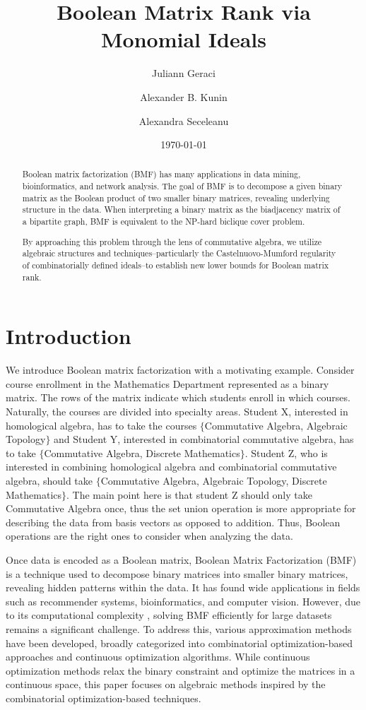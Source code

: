 \documentclass[11pt,letterpaper, reqno]{amsart}
\title{Boolean Matrix Rank via Monomial Ideals}
\author[]{Juliann Geraci}
\author[]{Alexander B. Kunin}
\author[]{Alexandra Seceleanu}
\date{\today}
\theoremstyle{definition}
\theoremstyle{remark}
\numberwithin{equation}{section}
\begin{document}
\begin{abstract}
Boolean matrix factorization (BMF) has many applications in data mining, bioinformatics, and network analysis. The goal of BMF is to decompose a given binary matrix as the Boolean product of two smaller binary matrices, revealing underlying structure in the data. When interpreting a binary matrix as the biadjacency matrix of a bipartite graph, BMF is equivalent to the NP-hard biclique cover problem.

By approaching this problem through the lens of commutative algebra, we utilize algebraic structures and techniques--particularly the Castelnuovo-Mumford regularity of combinatorially defined ideals--to establish new lower bounds for Boolean matrix rank. 
\end{abstract}
\maketitle

\section{Introduction}


We introduce Boolean matrix factorization with a motivating example. Consider course enrollment in the Mathematics Department represented as a binary matrix. The rows of the matrix indicate which students enroll in which courses. Naturally, the courses are divided into specialty areas. Student X, interested in homological algebra, has to take the courses $\{$Commutative Algebra, Algebraic Topology$\}$ and Student Y, interested in combinatorial commutative algebra, has to take $\{$Commutative Algebra, Discrete Mathematics$\}$. Student Z, who is interested in combining homological algebra and combinatorial commutative algebra, should take $\{$Commutative Algebra, Algebraic Topology, Discrete Mathematics$\}$. The main point here is that student Z should only take Commutative Algebra once, thus the set union operation is more appropriate for describing the data from basis vectors as opposed to addition. Thus, Boolean operations are the right ones to consider when analyzing the data.

Once data is encoded as a Boolean matrix, Boolean Matrix Factorization (BMF) is a technique used to decompose binary matrices into smaller binary matrices, revealing hidden patterns within the data. It has found wide applications in fields such as recommender systems, bioinformatics, and computer vision. However, due to its computational complexity \cite{ORLIN1977406}, solving BMF efficiently for large datasets remains a significant challenge. To address this, various approximation methods have been developed, broadly categorized into combinatorial optimization-based approaches and continuous optimization algorithms. While continuous optimization methods relax the binary constraint and optimize the matrices in a continuous space, this paper focuses on algebraic methods inspired by the combinatorial optimization-based techniques.
\end{document}
